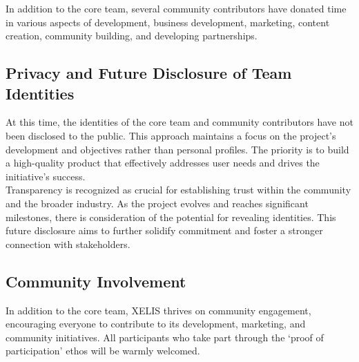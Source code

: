 \documentclass[12pt,a4paper,twocolumn]{article}
\begin{document}
In addition to the core team, several community contributors have donated time in various aspects of development, business development, marketing, content creation, community building, and developing partnerships. 

\subsection{Privacy and Future Disclosure of Team Identities}

At this time, the identities of the core team and community contributors have not been disclosed to the public. This approach maintains a focus on the project’s development and objectives rather than personal profiles. The priority is to build a high-quality product that effectively addresses user needs and drives the initiative's success.\\

Transparency is recognized as crucial for establishing trust within the community and the broader industry. As the project evolves and reaches significant milestones, there is consideration of the potential for revealing identities. This future disclosure aims to further solidify commitment and foster a stronger connection with stakeholders.

\subsection{Community Involvement}
In addition to the core team, XELIS thrives on community engagement, encouraging everyone to contribute to its development, marketing, and community initiatives. All participants who take part through the ‘proof of participation’ ethos will be warmly welcomed.
\end{document}
